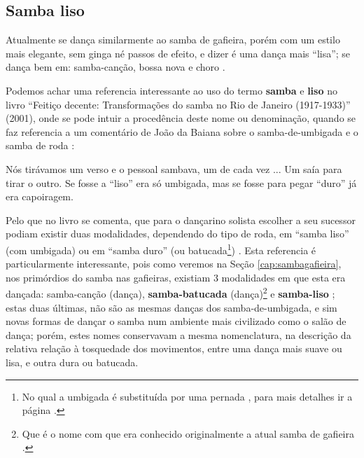 \subsection{Samba liso} 
\label{subsec:sambalisodef}
Atualmente se dança similarmente ao samba de gafieira, 
porém com um estilo mais elegante, sem ginga né passos de efeito, e dizer é uma dança mais ``lisa'';
se dança bem em: samba-canção, bossa nova e choro \cite[pp. 134]{perna2002samba}.


Podemos achar uma referencia interessante ao uso do termo \textbf{samba} e \textbf{liso}  no livro 
``Feitiço decente: Transformações do samba no Rio de Janeiro (1917-1933)'' (2001),
onde se pode intuir a procedência deste nome ou denominação, 
quando se faz referencia a um comentário de João da Baiana sobre o samba-de-umbigada e o samba de roda \cite[pp. 109]{sandroni2001feitico}: 
\begin{citando}
Nós tirávamos um verso e o pessoal sambava, um de cada vez ... 
Um saía para tirar o outro.
Se fosse a ``liso'' era só umbigada, mas se fosse para pegar ``duro'' já era capoiragem. 
\end{citando}
Pelo que no livro se comenta, que para o dançarino solista  escolher a seu sucessor podiam
existir duas modalidades, dependendo do tipo de roda, em ``samba liso'' (com umbigada) ou em ``samba duro'' 
(ou batucada\footnote{No qual a umbigada é substituída por uma pernada \cite[pp. 109]{sandroni2001feitico},
para mais detalhes ir a página \pageref{ref:batuquedanca}.}) \cite[pp. 109]{sandroni2001feitico}.
Esta referencia 
é particularmente interessante, pois como veremos na Seção \ref{cap:sambagafieira},
nos primórdios do samba nas gafieiras, existiam 3 modalidades em que esta era dançada: samba-canção (dança),
\textbf{samba-batucada} (dança)\footnote{Que 
é o nome com que era conhecido originalmente a atual samba de gafieira \cite[pp. 143]{perna2002samba}.} 
e \textbf{samba-liso} \cite[pp. 143]{perna2002samba};
estas duas últimas, não são as mesmas danças dos samba-de-umbigada, 
e sim novas formas de dançar o samba num ambiente mais civilizado como o salão de dança;
porém, estes nomes conservavam a mesma nomenclatura, na descrição 
da relativa relação à tosquedade dos movimentos, entre uma dança mais suave ou lisa, 
e outra dura ou batucada.



